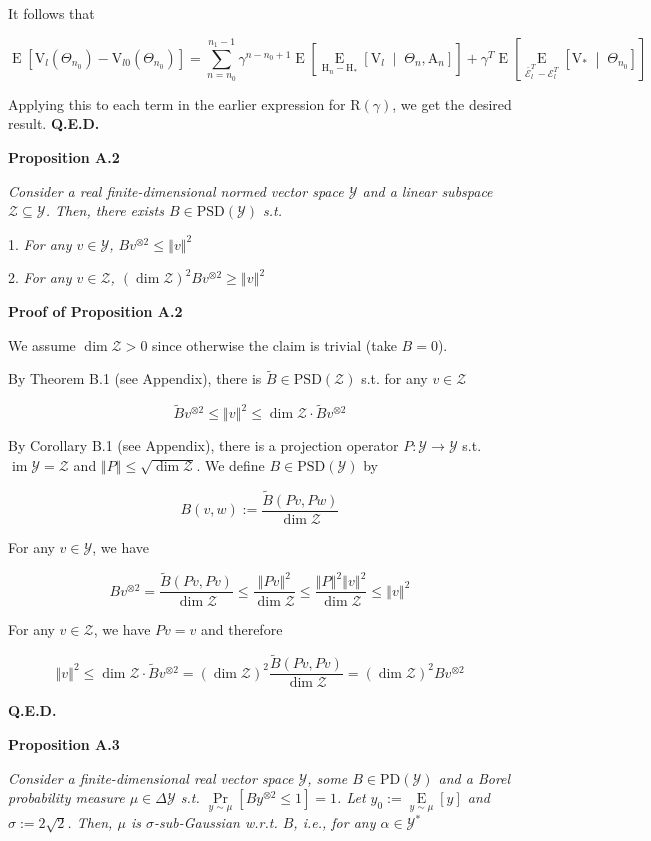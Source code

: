 \documentclass[a4paper]{article}
\newcommand{\Co}[1]{}
\newcommand{\AP}[1]{\left(#1\right)}
\newcommand{\AB}[1]{\left[#1\right]}
\newcommand{\ABM}[2]{\left[#1\;\middle\vert\;#2\right]}
\newcommand{\Pa}[2]{\underset{#1}{\operatorname{Pr}}\AB{#2}}
\newcommand{\Ea}[2]{\underset{#1}{\operatorname{E}}\AB{#2}}
\newcommand{\CE}[3]{\underset{#1}{\operatorname{E}}\ABM{#2}{#3}}
\newcommand{\PD}{\mathrm{PD}}
\newcommand{\PSD}{\mathrm{PSD}}
\DeclareMathOperator{\Img}{im}
\newcommand{\Norm}[1]{\left\Vert #1 \right\Vert}
\newcommand{\B}{B}
\newcommand{\Y}{\mathcal{Y}}
\newcommand{\Z}{\mathcal{Z}}
\newcommand{\V}{\mathrm{V}}
\newcommand{\Reg}{\mathrm{R}}
\newcommand{\AT}{\mathrm{A}}
\newcommand{\THy}{\mathrm{H}_*}
\newcommand{\SHy}{\mathrm{H}}
\newcommand{\Ev}{\mathcal{E}}
\begin{document}
It follows that

$$\Ea{}{\V_{l}\AP{\Theta_{n_0}}-\V_{l0}\AP{\Theta_{n_0}}}=\sum_{n=n_0}^{n_1-1}\gamma^{n-n_0+1}\Ea{}{\CE{\SHy_n-\THy}{\V_{l}}{\Theta_n,\AT_n}}+\gamma^T\Ea{}{\CE{\bar{\Ev}_l^T-\Ev_l^T}{\V_*}{\Theta_{n_0}}}$$

Applying this to each term in the earlier expression for $\Reg(\gamma)$, we get the desired result. \textbf{Q.E.D.}\Co{b}

\textbf{Proposition A.2}\Co{b}

\textit{Consider a real finite-dimensional normed vector space $\Y$ and a linear subspace $\Z\subseteq \Y$. Then, there exists $\B \in\PSD(\Y)$ s.t.}\Co{i}

1. \textit{For any $v\in \Y$, $\B v^{\otimes 2}\leq\Norm{v}^2$}\Co{i}

2. \textit{For any $v\in \Z$, $\AP{\dim{\Z}}^2 \B v^{\otimes 2}\geq \Norm{v}^2$}\Co{i}

\textbf{Proof of Proposition A.2}\Co{b}

We assume $\dim{\Z}>0$ since otherwise the claim is trivial (take $B=0$).

By Theorem B.1 (see Appendix), there is $\tilde{B}\in\PSD(\Z)$ s.t. for any $v\in\Z$

$$\tilde{B}v^{\otimes2}\leq\Norm{v}^2\leq\dim{\Z}\cdot\tilde{B}v^{\otimes2}$$

By Corollary B.1 (see Appendix), there is a projection operator $P:\Y\rightarrow\Y$ s.t. $\Img{\Y}=\Z$ and $\Norm{P}\leq\sqrt{\dim{\Z}}$. We define $B\in\PSD(\Y)$ by

$$B(v,w):=\frac{\tilde{B}\AP{Pv,Pw}}{\dim{\Z}}$$

For any $v\in\Y$, we have

$$Bv^{\otimes2}=\frac{\tilde{B}\AP{Pv,Pv}}{\dim{\Z}}\leq\frac{\Norm{Pv}^2}{\dim{\Z}}\leq\frac{\Norm{P}^2\Norm{v}^2}{\dim{\Z}}\leq\Norm{v}^2$$

For any $v\in\Z$, we have $Pv=v$ and therefore

$$\Norm{v}^2\leq\dim{\Z}\cdot\tilde{B}v^{\otimes2}=\AP{\dim{\Z}}^2\frac{\tilde{B}(Pv,Pv)}{\dim{\Z}}=\AP{\dim{\Z}}^2Bv^{\otimes2}$$
 
\textbf{Q.E.D.}\Co{b}

\textbf{Proposition A.3}\Co{b}

\textit{Consider a finite-dimensional real vector space $\Y$, some $\B \in\PD(\Y)$ and a Borel probability measure $\mu\in\Delta\Y$ s.t. $\Pa{y\sim\mu}{\B y^{\otimes 2} \leq 1} = 1$. Let $y_0:=\Ea{y\sim\mu}{y}$ and $\sigma:=2\sqrt{2}$. Then, $\mu$ is $\sigma$-sub-Gaussian w.r.t. $\B $, i.e., for any $\alpha\in\Y^*$}\Co{i}
\end{document}
